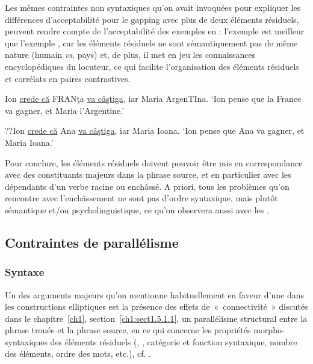 Les mêmes contraintes non syntaxiques qu’on avait invoquées pour expliquer les différences d’acceptabilité pour le gapping avec plus de deux éléments résiduels, peuvent rendre compte de l’acceptabilité des exemples en  : l’exemple  est meilleur que l’exemple , car les éléments résiduels ne sont sémantiquement pas de même nature (humain \textit{vs}. pays) et, de plus, il met en jeu les connaissances encyclopédiques du locuteur, ce qui facilite l’organisation des éléments résiduels et corrélats en paires contrastives.  

\ea \label{ch2:ex131}
\ea Ion \uline{crede că} FRANţa \uline{va câştiga}, iar Maria ArgenTIna. \label{ch2:ex131a}
\glt  ‘Ion pense que la France va gagner, et Maria l’Argentine.’

\ex  ??Ion \uline{crede că} Ana \uline{va câştiga}, iar Maria Ioana. \label{ch2:ex131b}
\glt  ‘Ion pense que Ana va gagner, et Maria Ioana.’ 
\z
\z

Pour conclure, les éléments résiduels doivent pouvoir être mis en correspondance avec des constituants majeurs dans la phrase source, et en particulier avec les dépendants d’un verbe racine ou enchâssé. A priori, tous les problèmes qu’on rencontre avec l’enchâssement ne sont pas d’ordre syntaxique, mais plutôt sémantique et/ou psycholinguistique, ce qu’on observera aussi avec les .

\subsection{Contraintes de parallélisme} \label{ch2:sect2.3.4}

\subsubsection{Syntaxe} \label{ch2:sect2.3.4.1}


Un des arguments majeurs qu’on mentionne habituellement en faveur d’une  dans les constructions elliptiques est la présence des effets de~«~connectivité~» discutés dans le chapitre~\ref{ch1}, section~\ref{ch1:sect1.5.1.1}, {\cad} un parallélisme structural entre la phrase trouée et la phrase source, en ce qui concerne les propriétés morpho-syntaxiques des éléments résiduels (, , catégorie et fonction syntaxique, nombre des éléments, ordre des mots, etc.), cf. \citet{Hartmann2000,CulicoverEtAl2005,Culicover2009}.

